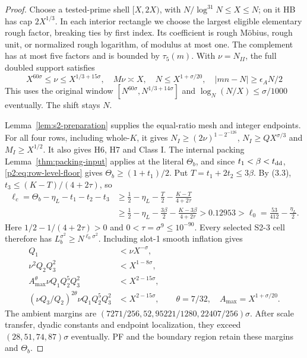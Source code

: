 \begin{proof}
Choose a tested-prime shell $[X,2X)$, with
$N/\log^{31}N\le X\le N$; on it HB has cap $2X^{1/3}$.
In each interior rectangle we choose the largest eligible elementary rough factor,
breaking ties by first index.
Its coefficient is rough M\"obius, rough unit, or normalized rough logarithm, of modulus at most one.
The complement has at most five factors and is bounded by $\tau_5(m)$.
With $\nu=N_{II}$, the full doubled support satisfies
\[
 X^{60\sigma}\le\nu\le X^{1/3+15\sigma},\quad M\nu\asymp X,
 \quad N\le X^{1+\sigma/20},\quad
 |mn-N|\ge\epsilon_A N/2
 \tag{3.9}
\]
This uses the original window $[N^{60\sigma},N^{1/3+14\sigma}]$ and
$\log_N(N/X)\le\sigma/1000$ eventually.
The shift stays $N$.

Lemma~\ref{lem:s2-preparation} supplies the equal-ratio mesh and integer endpoints.
For all four rows, including whole-$K$, it gives
$N_I\ge(2\nu)^{1-2^{-126}}$, $N_I\ge QX^{\sigma/3}$ and $M_I\ge X^{1/2}$.
It also gives H6, H7 and Class I.
The internal packing Lemma~\ref{thm:packing-input} applies at the literal $\Theta_b$,
and since $t_1<\beta<t_{\rm dd}$,
\eqref{p2:eq:row-level-floor} gives $\Theta_b\ge(1+t_1)/2$.
Put $T=t_1+2t_2\le3\beta$.
By (3.3), $t_3\le(K-T)/(4+2\tau)$, so
{\small
\[
\begin{aligned}
\ell_c=\Theta_b-\eta_L-t_1-t_2-t_3
&\ge\frac12-\eta_L-\frac T2-\frac{K-T}{4+2\tau}\\
&\ge\frac12-\eta_L-\frac{3\beta}{2}
              -\frac{K-3\beta}{4+2\tau}
>0.12953>\ell_0=\frac{53}{412}-\frac{\eta_L}{2}.
\end{aligned}
\]
}
Here $1/2-1/(4+2\tau)>0$ and $0<\tau=\sigma^9\le10^{-90}$.
Every selected S2-3 cell therefore has
$L_b^{\sigma^2}\ge N^{\ell_0\sigma^2}$.
Including slot-1 smooth inflation gives
\[
\begin{split}
 Q_1&<\nu X^{-\sigma},\\
 \nu^2Q_2Q_3^2&<X^{1-8\sigma},\\
 A_{\max}^{\theta}\nu Q_1Q_2^5Q_3^2&<X^{2-15\sigma},\\
 (\nu Q_3/Q_2)^{2\theta}\nu Q_1Q_2^5Q_3^2&<X^{2-15\sigma},
 \qquad \theta=7/32,\quad A_{\max}=X^{1+\sigma/20}.
\end{split}\tag{3.10}
\]
The ambient margins are
$(7271/256,52,95221/1280,22407/256)\sigma$.
After scale transfer, dyadic constants and endpoint localization, they exceed
$(28,51,74,87)\sigma$ eventually.
PF and the boundary region retain these margins and $\Theta_b$.


\end{proof}
